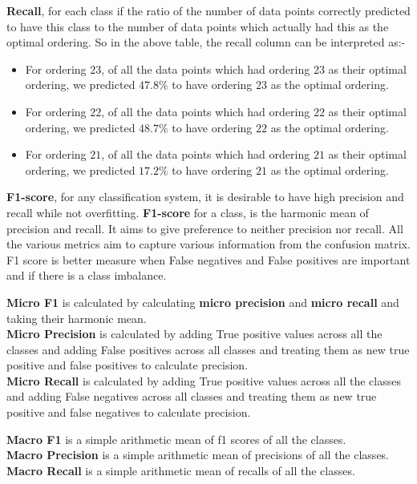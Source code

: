 \textbf{Recall}, for each class if the ratio of the number of data points correctly predicted to have this class to the number of data points which actually had this as the optimal ordering. So in the above table, the recall column can be interpreted as:-
\begin{itemize}
    \item For ordering $23$, of all the data points which had ordering $23$ as their optimal ordering, we predicted $47.8\%$ to have ordering $23$ as the optimal ordering.
    \item For ordering $22$, of all the data points which had ordering $22$ as their optimal ordering, we predicted $48.7\%$ to have ordering $22$ as the optimal ordering.
    \item For ordering $21$, of all the data points which had ordering $21$ as their optimal ordering, we predicted $17.2\%$ to have ordering $21$ as the optimal ordering.
\end{itemize} 

\textbf{F1-score}, for any classification system, it is desirable to have high precision and recall while not overfitting. \textbf{F1-score}  for a class, is the harmonic mean of precision and recall. It aims to give preference to neither precision nor recall. All the various metrics aim to capture various information from the confusion matrix. F1 score is better measure when False negatives and False positives are important and if there is a class imbalance.\\

\par \textbf{Micro F1} is calculated by calculating \textbf{micro precision} and \textbf{micro recall} and taking their harmonic mean.\\
\textbf{Micro Precision} is calculated by adding True positive values across all the classes and adding False positives across all classes and treating them as new true positive and false positives to calculate precision.\\
\textbf{Micro Recall} is calculated by adding True positive values across all the classes and adding False negatives across all classes and treating them as new true positive and false negatives to calculate precision.

\par \textbf{Macro F1} is a simple arithmetic mean of f1 scores of all the classes.\\
\textbf{Macro Precision} is a simple arithmetic mean of precisions of all the classes.\\
\textbf{Macro Recall} is a simple arithmetic mean of recalls of all the classes.\\

